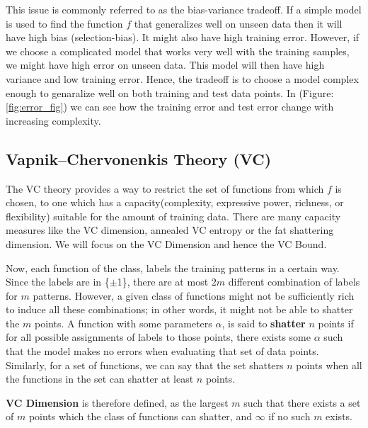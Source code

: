 \documentclass{article}
\begin{document}
This issue is commonly referred to as the bias-variance tradeoff. If a simple model is used to find the function $f$ that generalizes well on unseen data then it will have high bias (selection-bias). It might also have high training error. However, if we choose a complicated model that works very well with the training samples, we might have high error on unseen data. This model will then have high variance and low training error. Hence, the tradeoff is to choose a model complex enough to genaralize well on both training and test data points. In (Figure: \ref{fig:error_fig}) we can see how the training error and test error change with increasing complexity.

\subsection{Vapnik–Chervonenkis Theory (VC)}
The VC theory provides a way to restrict the set of functions from which $f$ is chosen, to one which has a capacity(complexity, expressive power, richness, or flexibility) suitable for the amount of training data. There are many capacity measures like the VC dimension, annealed VC entropy or the fat shattering dimension. We will focus on the VC Dimension and hence the VC Bound.

Now, each function of the class, labels the training patterns in a certain way. Since the labels are in \{$\pm$1\}, there are at most $2m$ different combination of labels for $m$ patterns. However, a given class of functions might not be sufficiently rich to induce all these combinations; in other words, it might not be able to shatter the $m$ points. A function with some parameters $\alpha$, is said to \textbf{shatter} $n$ points if for all possible assignments of labels to those points, there exists some $\alpha$ such that the model makes no errors when evaluating that set of data points.  Similarly, for a set of functions, we can say that the set shatters $n$ points when all the functions in the set can shatter at least $n$ points. 

\textbf{VC Dimension} is therefore defined, as the largest $m$ such that there exists a set of $m$ points which the class of functions can shatter, and $\infty$ if no such $m$ exists.
\end{document}
